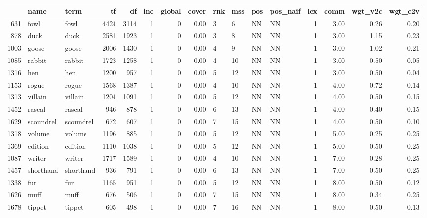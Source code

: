 \begin{table}[ht]
\centering
\begin{tabular}{rllrrrrrllllrrrr}
  \hline
 & name & term & tf & df & inc & global & cover & rnk & mss & pos & pos\_naif & lex & comm & wgt\_v2c & wgt\_c2v \\ 
  \hline
631 & fowl & fowl & 4424 & 3114 &   1 &   0 & 0.00 & 3 & 6 & NN & NN &   1 & 3.00 & 0.26 & 0.20 \\ 
  878 & duck & duck & 2581 & 1923 &   1 &   0 & 0.00 & 3 & 8 & NN & NN &   1 & 3.00 & 1.15 & 0.23 \\ 
  1003 & goose & goose & 2006 & 1430 &   1 &   0 & 0.00 & 4 & 9 & NN & NN &   1 & 3.00 & 1.02 & 0.21 \\ 
  1085 & rabbit & rabbit & 1723 & 1258 &   1 &   0 & 0.00 & 4 & 10 & NN & NN &   1 & 3.00 & 0.50 & 0.05 \\ 
  1316 & hen & hen & 1200 & 957 &   1 &   0 & 0.00 & 5 & 12 & NN & NN &   1 & 3.00 & 0.50 & 0.04 \\ 
  1153 & rogue & rogue & 1568 & 1387 &   1 &   0 & 0.00 & 4 & 10 & NN & NN &   1 & 4.00 & 0.72 & 0.14 \\ 
  1313 & villain & villain & 1204 & 1091 &   1 &   0 & 0.00 & 5 & 12 & NN & NN &   1 & 4.00 & 0.50 & 0.15 \\ 
  1452 & rascal & rascal & 946 & 878 &   1 &   0 & 0.00 & 6 & 13 & NN & NN &   1 & 4.00 & 0.40 & 0.15 \\ 
  1629 & scoundrel & scoundrel & 672 & 607 &   1 &   0 & 0.00 & 7 & 15 & NN & NN &   1 & 4.00 & 0.50 & 0.10 \\ 
  1318 & volume & volume & 1196 & 885 &   1 &   0 & 0.00 & 5 & 12 & NN & NN &   1 & 5.00 & 0.25 & 0.25 \\ 
  1369 & edition & edition & 1110 & 1038 &   1 &   0 & 0.00 & 5 & 12 & NN & NN &   1 & 5.00 & 0.50 & 0.25 \\ 
  1087 & writer & writer & 1717 & 1589 &   1 &   0 & 0.00 & 4 & 10 & NN & NN &   1 & 7.00 & 0.28 & 0.25 \\ 
  1457 & shorthand & shorthand & 936 & 791 &   1 &   0 & 0.00 & 6 & 13 & NN & NN &   1 & 7.00 & 0.50 & 0.25 \\ 
  1338 & fur & fur & 1165 & 951 &   1 &   0 & 0.00 & 5 & 12 & NN & NN &   1 & 8.00 & 0.50 & 0.12 \\ 
  1626 & muff & muff & 676 & 506 &   1 &   0 & 0.00 & 7 & 15 & NN & NN &   1 & 8.00 & 0.34 & 0.25 \\ 
  1678 & tippet & tippet & 605 & 498 &   1 &   0 & 0.00 & 7 & 16 & NN & NN &   1 & 8.00 & 0.50 & 0.13 \\ 

\end{tabular}
\end{table}
